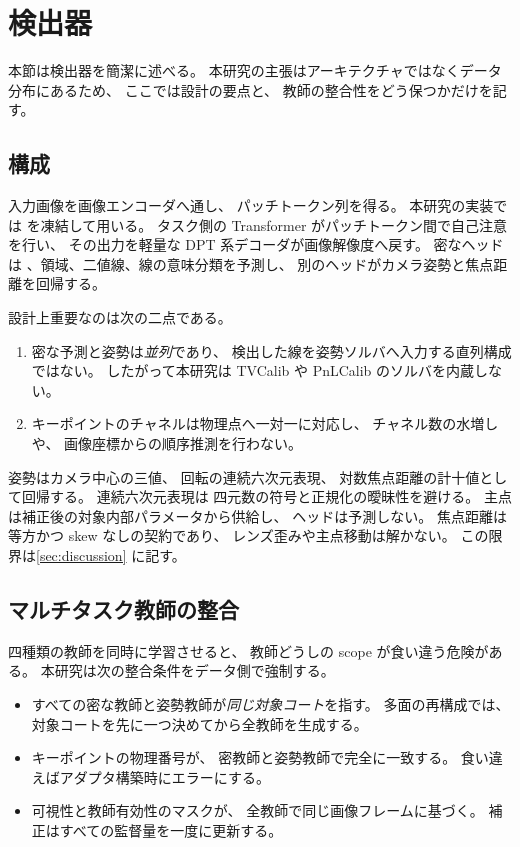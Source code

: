 \section{検出器}
\label{sec:detector}

本節は検出器を簡潔に述べる。
本研究の主張はアーキテクチャではなくデータ分布にあるため、
ここでは設計の要点と、
教師の整合性をどう保つかだけを記す。

\subsection{構成}
\label{sec:detector_arch}

入力画像を画像エンコーダへ通し、
パッチトークン列を得る。
本研究の実装では \BackboneName\cite{simeoni2025dinov3} を凍結して用いる。
タスク側の Transformer がパッチトークン間で自己注意を行い、
その出力を軽量な DPT 系デコーダ\cite{ranftl2021dpt}が画像解像度へ戻す。
密なヘッドは \KPName、領域、二値線、線の意味分類を予測し、
別のヘッドがカメラ姿勢と焦点距離を回帰する。

設計上重要なのは次の二点である。

\begin{enumerate}[leftmargin=1.6em]
  \item 密な予測と姿勢は\emph{並列}であり、
  検出した線を姿勢ソルバへ入力する直列構成ではない。
  したがって本研究は TVCalib や PnLCalib のソルバを内蔵しない。
  \item キーポイントのチャネルは物理点へ一対一に対応し、
  チャネル数の水増しや、
  画像座標からの順序推測を行わない。
\end{enumerate}

姿勢はカメラ中心の三値、
回転の連続六次元表現、
対数焦点距離の計十値として回帰する。
連続六次元表現\cite{zhou2019continuity}は
四元数の符号と正規化の曖昧性を避ける。
主点は補正後の対象内部パラメータから供給し、
ヘッドは予測しない。
焦点距離は等方かつ skew なしの契約であり、
レンズ歪みや主点移動は解かない。
この限界は\cref{sec:discussion} に記す。

\subsection{マルチタスク教師の整合}
\label{sec:task_consistency}

四種類の教師を同時に学習させると、
教師どうしの scope が食い違う危険がある。
本研究は次の整合条件をデータ側で強制する。

\begin{itemize}[leftmargin=1.6em]
  \item すべての密な教師と姿勢教師が\emph{同じ対象コート}を指す。
  多面の再構成では、
  対象コートを先に一つ決めてから全教師を生成する。
  \item キーポイントの物理番号が、
  密教師と姿勢教師で完全に一致する。
  食い違えばアダプタ構築時にエラーにする。
  \item 可視性と教師有効性のマスクが、
  全教師で同じ画像フレームに基づく。
  補正はすべての監督量を一度に更新する。
\end{itemize}

